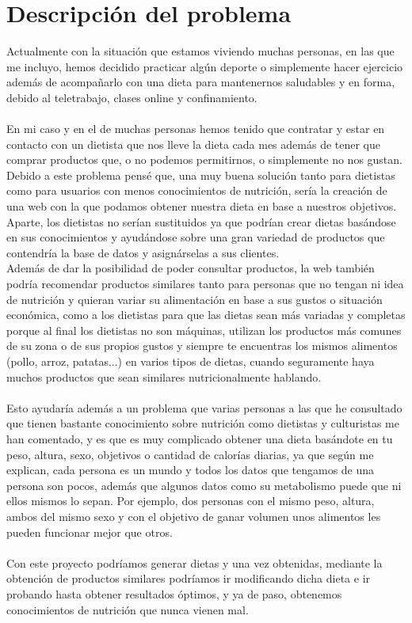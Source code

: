 \chapter{Descripción del problema} \label{sec:problema}

Actualmente con la situación que estamos viviendo muchas personas, en las que me incluyo, hemos 
decidido practicar algún deporte o simplemente hacer ejercicio además de acompañarlo con una dieta 
para mantenernos saludables y en forma, debido al teletrabajo, clases online y confinamiento.
\\\\
En mi caso y en el de muchas personas hemos tenido que contratar y estar en contacto con un dietista que nos lleve la dieta 
cada mes además de tener que comprar productos que, o no podemos permitirnos, o simplemente no nos gustan.\\

Debido a este problema pensé que, una muy buena solución tanto para dietistas como para usuarios con menos conocimientos de 
nutrición, sería la creación de una web con la que podamos obtener nuestra dieta en base a nuestros objetivos. Aparte, los 
dietistas no serían sustituidos ya que podrían crear dietas basándose en sus conocimientos y ayudándose sobre una gran variedad 
de productos que contendría la base de datos y asignárselas a sus clientes.\\

Además de dar la posibilidad de poder consultar productos, la web también podría recomendar productos similares tanto para personas que no 
tengan ni idea de nutrición y quieran variar su alimentación en base a sus gustos o situación económica, como a los dietistas para que 
las dietas sean más variadas y completas porque al final los dietistas no son máquinas, utilizan los productos más comunes de su zona o de sus propios gustos
y siempre te encuentras los mismos alimentos (pollo, arroz, patatas...) en varios tipos de dietas, cuando seguramente haya muchos productos que
sean similares nutricionalmente hablando.
\\\\
Esto ayudaría además a un problema que varias personas a las que he consultado que tienen bastante conocimiento sobre nutrición como dietistas y culturistas me han comentado, 
y es que es muy complicado obtener una dieta basándote en tu peso, altura, sexo, objetivos o cantidad de calorías diarias, ya que según me explican,
cada persona es un mundo y todos los datos que tengamos de una persona son pocos, además que algunos datos como su metabolismo puede que ni ellos mismos lo sepan.
Por ejemplo, dos personas con el mismo peso, altura, ambos del mismo sexo y con el objetivo de ganar volumen unos alimentos les pueden funcionar mejor que otros.\\ \\

Con este proyecto podríamos generar dietas y una vez obtenidas, mediante la obtención de productos similares podríamos ir modificando dicha dieta e ir probando hasta obtener resultados
óptimos, y ya de paso, obtenemos conocimientos de nutrición que nunca vienen mal.
